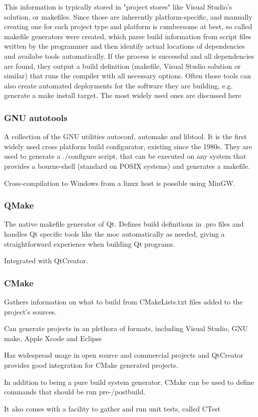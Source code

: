 This information is typically stored in "project stores" like Visual Studio's solution, or makefiles. Since those are inherently platform-specific, and manually creating one for each project type and platform is cumbersome at best, so called makefile generators were created, which parse build information from script files written by the programmer and then identify actual locations of dependencies and availabe tools automatically. If the process is successful and all dependencies are found, they output a build definition (makefile, Visual Studio solution or similar) that runs the compiler with all necessary options. Often those tools can also create automated deployments for the software they are building, e.g. generate a make install target. The most widely used ones are discussed here

\subsubsection{GNU autotools}
A collection of the GNU utilities autoconf, automake and libtool. It is the first widely used cross platform build configurator, existing since the 1980s. They are used to generate a ./configure script, that can be executed on any system that provides a bourne-shell (standard on POSIX systems) and generates a makefile.

Cross-compilation to Windows from a linux host is possible using MinGW. 
\subsubsection{QMake}
The native makefile generator of Qt. Defines build definitions in .pro files and handles Qt specific tools like the \gls{moc} automatically as needed, giving a straightforward experience when building Qt programs.

Integrated with QtCreator.

\subsubsection{CMake}
Gathers information on what to build from CMakeLists.txt files added to the project's sources.

Can generate projects in an plethora of formats, including Visual Studio, GNU make,  Apple Xcode and Eclipse

Has widespread usage in open source and commercial projects and QtCreator provides good integration for CMake generated projects.

In addition to being a pure build system generator, CMake can be used to define commands that should be run pre-/postbuild.

It also comes with a facility to gather and run unit tests, called CTest
